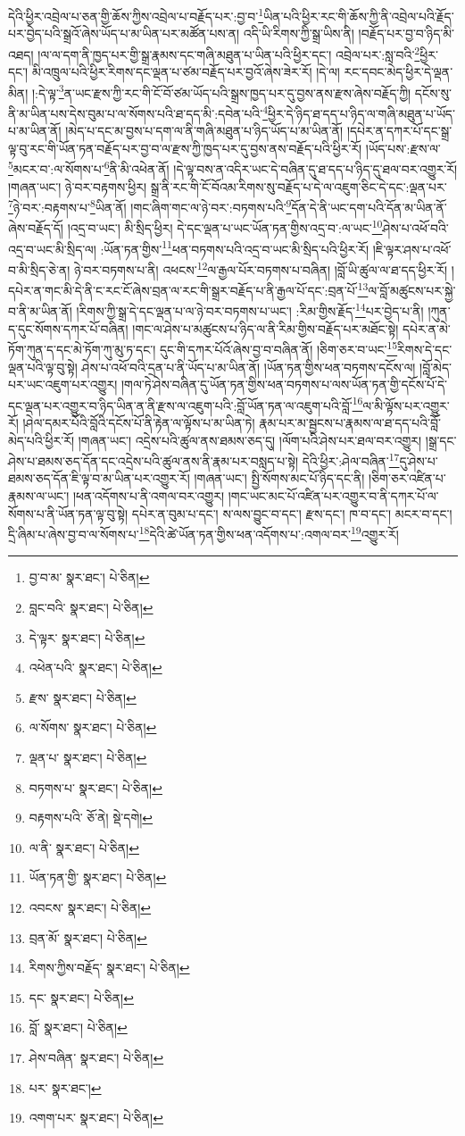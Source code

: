 དེའི་ཕྱིར་འབྲེལ་པ་ཅན་གྱི་ཆོས་ཀྱིས་འབྲེལ་པ་བརྗོད་པར་:བྱ་བ་\footnote{བྱ་བ་མ་  སྣར་ཐང་།  པེ་ཅིན། }ཡིན་པའི་ཕྱིར་རང་གི་ཆོས་ཀྱི་ནི་འབྲེལ་པའི་རྗོད་པར་བྱེད་པའི་སྒྲའོ་ཞེས་ཡོད་པ་མ་ཡིན་པར་མཚོན་པས་ན། འདི་ཡི་རིགས་ཀྱི་སྒྲ་ཡིས་ནི། །བརྗོད་པར་བྱ་བ་ཉིད་མི་འཐད། །ལ་ལ་དག་ནི་ཁྱད་པར་གྱི་སྒྲ་རྣམས་དང་གཞི་མཐུན་པ་ཡིན་པའི་ཕྱིར་དང་། འབྲེལ་པར་:སླ་བའི་\footnote{བླང་བའི་  སྣར་ཐང་།  པེ་ཅིན། }ཕྱིར་དང་། མི་འཁྲུལ་པའི་ཕྱིར་རིགས་དང་ལྡན་པ་ཙམ་བརྗོད་པར་བྱའོ་ཞེས་ཟེར་རོ། །དེ་ལ། རང་དབང་མེད་ཕྱིར་དེ་ལྡན་མིན། །:དེ་ལྟ་\footnote{དེ་ལྟར་  སྣར་ཐང་།  པེ་ཅིན། }ན་ཡང་རྫས་ཀྱི་རང་གི་ངོ་བོ་ཙམ་ཡོད་པའི་སྒྲས་ཁྱད་པར་དུ་བྱས་ནས་རྫས་ཞེས་བརྗོད་ཀྱི། དངོས་སུ་ནི་མ་ཡིན་པས་དེས་བུམ་པ་ལ་སོགས་པའི་ཐ་དད་མི་:དབེན་པའི་\footnote{འཕེན་པའི་  སྣར་ཐང་།  པེ་ཅིན། }ཕྱིར་དེ་ཉིད་ཐ་དད་པ་ཉིད་ལ་གཞི་མཐུན་པ་ཡོད་པ་མ་ཡིན་ནོ། །མེད་པ་དང་མ་བྱས་པ་དག་ལ་ནི་གཞི་མཐུན་པ་ཉིད་ཡོད་པ་མ་ཡིན་ནོ། །དཔེར་ན་དཀར་པོ་དང་སྒྲ་ལྟ་བུ་རང་གི་ཡོན་ཏན་བརྗོད་པར་བྱ་བ་ལ་རྫས་ཀྱི་ཁྱད་པར་དུ་བྱས་ནས་བརྗོད་པའི་ཕྱིར་རོ། །ཡོད་པས་:རྫས་ལ་\footnote{རྫས་  སྣར་ཐང་།  པེ་ཅིན། }མངར་བ་:ལ་སོགས་པ་\footnote{ལ་སོགས་  སྣར་ཐང་།  པེ་ཅིན། }ནི་མི་འཕེན་ནོ། །དེ་ལྟ་བས་ན་འདིར་ཡང་དེ་བཞིན་དུ་ཐ་དད་པ་ཉིད་དུ་ཐལ་བར་འགྱུར་རོ། །གཞན་ཡང་། ཉེ་བར་བརྟགས་ཕྱིར། སྒྲ་ནི་རང་གི་ངོ་བོའམ་རིགས་སུ་བརྗོད་པ་དེ་ལ་འཇུག་ཅིང་དེ་དང་:ལྡན་པར་\footnote{ལྡན་པ་  སྣར་ཐང་།  པེ་ཅིན། }ཉེ་བར་:བརྟགས་པ་\footnote{བཏགས་པ་  སྣར་ཐང་།  པེ་ཅིན། }ཡིན་ནོ། །གང་ཞིག་གང་ལ་ཉེ་བར་:བཏགས་པའི་\footnote{བརྟགས་པའི་  ཅོ་ནེ།  སྡེ་དགེ། }དོན་དེ་ནི་ཡང་དག་པའི་དོན་མ་ཡིན་ནོ་ཞེས་བརྗོད་དོ། །འདྲ་བ་ཡང་། མི་སྲིད་ཕྱིར། དེ་དང་ལྡན་པ་ཡང་ཡོན་ཏན་གྱིས་འདྲ་བ་:ལ་ཡང་\footnote{ལ་ནི་  སྣར་ཐང་།  པེ་ཅིན། }ཤེས་པ་འཕོ་བའི་འདྲ་བ་ཡང་མི་སྲིད་ལ། :ཡོན་ཏན་གྱིས་\footnote{ཡོན་ཏན་གྱི་  སྣར་ཐང་།  པེ་ཅིན། }ཕན་བཏགས་པའི་འདྲ་བ་ཡང་མི་སྲིད་པའི་ཕྱིར་རོ། །ཇི་ལྟར་ཤས་པ་འཕོ་བ་མི་སྲིད་ཅེ་ན། ཉེ་བར་བཏགས་པ་ནི། འཕངས་\footnote{འབངས་  སྣར་ཐང་།  པེ་ཅིན། }ལ་རྒྱལ་པོར་བཏགས་པ་བཞིན། །བློ་ཡི་ཚུལ་ལ་ཐ་དད་ཕྱིར་རོ། །དཔེར་ན་གང་མི་དེ་ནི་ང་རང་ངོ་ཞེས་བྲན་ལ་རང་གི་སྒྲར་བརྗོད་པ་ནི་རྒྱལ་པོ་དང་:བྲན་པོ་\footnote{བྲན་མོ་  སྣར་ཐང་།  པེ་ཅིན། }ལ་བློ་མཚུངས་པར་སྐྱེ་བ་ནི་མ་ཡིན་ནོ། །རིགས་ཀྱི་སྒྲ་དེ་དང་ལྡན་པ་ལ་ཉེ་བར་བཏགས་པ་ཡང་། :རིམ་གྱིས་རྗོད་\footnote{རིགས་ཀྱིས་བརྗོད་  སྣར་ཐང་།  པེ་ཅིན། }པར་བྱེད་པ་ནི། །ཀུན་ད་དུང་སོགས་དཀར་པོ་བཞིན། །གང་ལ་ཤེས་པ་མཚུངས་པ་ཉིད་ལ་ནི་རིམ་གྱིས་བརྗོད་པར་མཐོང་སྟེ། དཔེར་ན་མེ་ཏོག་ཀུན་ད་དང་མེ་ཏོག་ཀུ་མུ་ཏ་དང་། དུང་གི་དཀར་པོའོ་ཞེས་བྱ་བ་བཞིན་ནོ། །ཅིག་ཅར་བ་ཡང་\footnote{དང་  སྣར་ཐང་།  པེ་ཅིན། }རིགས་དེ་དང་ལྡན་པའི་ལྟ་བུ་སྟེ། ཤེས་པ་འཕོ་བའི་དྲན་པ་ནི་ཡོད་པ་མ་ཡིན་ནོ། །ཡོན་ཏན་གྱིས་ཕན་བཏགས་དངོས་ལ། །བློ་མེད་པར་ཡང་འཇུག་པར་འགྱུར། །གལ་ཏེ་ཤེས་བཞིན་དུ་ཡོན་ཏན་གྱིས་ཕན་བཏགས་པ་ལས་ཡོན་ཏན་གྱི་དངོས་པོ་དེ་དང་ལྡན་པར་འགྱུར་བ་ཉིད་ཡིན་ན་ནི་རྫས་ལ་འཇུག་པའི་:བློ་ཡོན་ཏན་ལ་འཇུག་པའི་བློ་\footnote{བློ་  སྣར་ཐང་།  པེ་ཅིན། }ལ་མི་ལྟོས་པར་འགྱུར་རོ། །ཤེལ་དམར་པོའི་བློའི་དངོས་པོ་ནི་རྟེན་ལ་ལྟོས་པ་མ་ཡིན་ཏེ། རྣམ་པར་མ་སྦྱངས་པ་རྣམས་ལ་ཐ་དད་པའི་བློ་མེད་པའི་ཕྱིར་རོ། །གཞན་ཡང་། འདྲེས་པའི་ཚུལ་ནས་ཐམས་ཅད་དུ། །ལོག་པའི་ཤེས་པར་ཐལ་བར་འགྱུར། །སྒྲ་དང་ཤེས་པ་ཐམས་ཅད་དོན་དང་འདྲེས་པའི་ཚུལ་ནས་ནི་རྣམ་པར་བསླད་པ་སྟེ། དེའི་ཕྱིར་:ཤེལ་བཞིན་\footnote{ཤེས་བཞིན་  སྣར་ཐང་།  པེ་ཅིན། }དུ་ཤེས་པ་ཐམས་ཅད་དོན་ཇི་ལྟ་བ་མ་ཡིན་པར་འགྱུར་རོ། །གཞན་ཡང་། སྤྱི་སོགས་མང་པོ་ཉིད་དང་ནི། །ཅིག་ཅར་འཛིན་པ་རྣམས་ལ་ཡང་། །ཕན་འདོགས་པ་ནི་འགལ་བར་འགྱུར། །གང་ཡང་མང་པོ་འཛིན་པར་འགྱུར་བ་ནི་དཀར་པོ་ལ་སོགས་པ་ནི་ཡོན་ཏན་ལྟ་བུ་སྟེ། དཔེར་ན་བུམ་པ་དང་། ས་ལས་བྱུང་བ་དང་། རྫས་དང་། ཁ་བ་དང་། མངར་བ་དང་། དྲི་ཞིམ་པ་ཞེས་བྱ་བ་ལ་སོགས་པ་\footnote{པར་  སྣར་ཐང་། }དེའི་ཚེ་ཡོན་ཏན་གྱིས་ཕན་འདོགས་པ་:འགལ་བར་\footnote{འགག་པར་  སྣར་ཐང་།  པེ་ཅིན། }འགྱུར་རོ། 